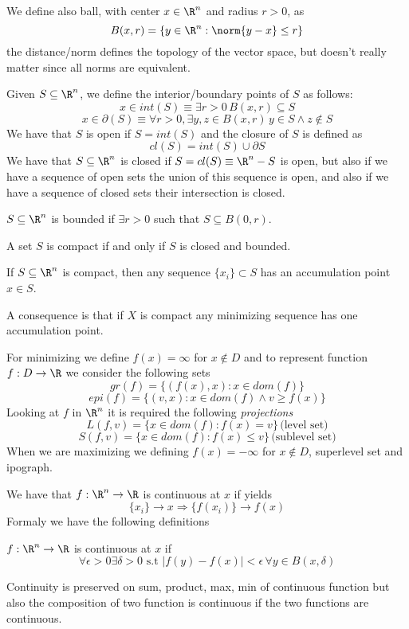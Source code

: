 We define also ball, with center $x \in \R^n$ and radius $r > 0$, as 
\[ B(x, r) = \{y \in \R^n : \norm{y - x} \leq r \} \]
the distance/norm defines the topology of the vector space, but doesn't really matter since 
all norms are equivalent.

Given $S \subseteq \R^n$, we define the interior/boundary points of $S$ as follows:
\[ x \in int(S) \equiv \exists r > 0 \, B(x, r) \subseteq S \]
\[ x \in \partial(S) \equiv \forall r > 0, \exists y, z \in B(x, r) \, y \in S \land z \not \in S \]
We have that $S$ is open if $S = int(S)$ and the closure of $S$ is defined as 
\[ cl(S) = int(S) \cup \partial S \]
We have that $S \subseteq \R^n$ is closed if $S = cl(S) \equiv \R^n - S$ is open, but also if 
we have a sequence of open sets the union of this sequence is open, and also if we have a sequence 
of closed sets their intersection is closed.

\begin{defi}
    $S \subseteq \R^n$ is bounded if $\exists r > 0$ such that $S \subseteq B(0, r)$.
\end{defi}
\begin{defi}
    A set $S$ is compact if and only if $S$ is closed and bounded.
\end{defi}
\begin{defi}
    Given a sequence $\{x_i\}$ we have that $x$ is an accumulation point if $\exists \{x_{n_i}}\}
    \to x \equiv \lim \inf_{i \to \infty} d(x_i, x) = 0$.
\end{defi}
\begin{thm}
    If $S \subseteq \R^n$ is compact, then any sequence $\{x_i\} \subset S$ has an accumulation 
    point $x \in S$.
\end{thm}
A consequence is that if $X$ is compact any minimizing sequence has one accumulation point.

For minimizing we define $f(x) = \infty$ for $x \not \in D$ and 
to represent function $f:D \to \R$ we consider the following sets
\[ gr(f) = \{(f(x), x): x \in dom(f)\} \]
\[ epi(f) = \{(v, x): x \in dom(f) \land v \geq f(x)\} \]
Looking at $f$ in $\R^n$ it is required the following \emph{projections}
\[ L(f, v) = \{x \in dom(f): f(x) = v\} \, \text{(level set)} \]
\[ S(f, v) = \{x \in dom(f): f(x) \leq v\}\, \text{(sublevel set)} \]
When we are maximizing we defining $f(x) = -\infty$ for $x \not \in D$, superlevel set and ipograph.

We have that $f:\R^n \to \R$ is continuous at $x$ if yields 
\[ \{x_i\} \to x \Rightarrow \{f(x_i)\} \to f(x) \]
Formaly we have the following definitions
\begin{defi}
    $f:\R^n \to \R$ is continuous at $x$ if 
    \[ \forall \epsilon > 0 \exists \delta > 0 \text{ s.t } |f(y) - f(x)| < \epsilon \, 
       \forall y \in B(x, \delta) \]
\end{defi}
Continuity is preserved on sum, product, max, min of continuous function but also the composition 
of two function is continuous if the two functions are continuous.

